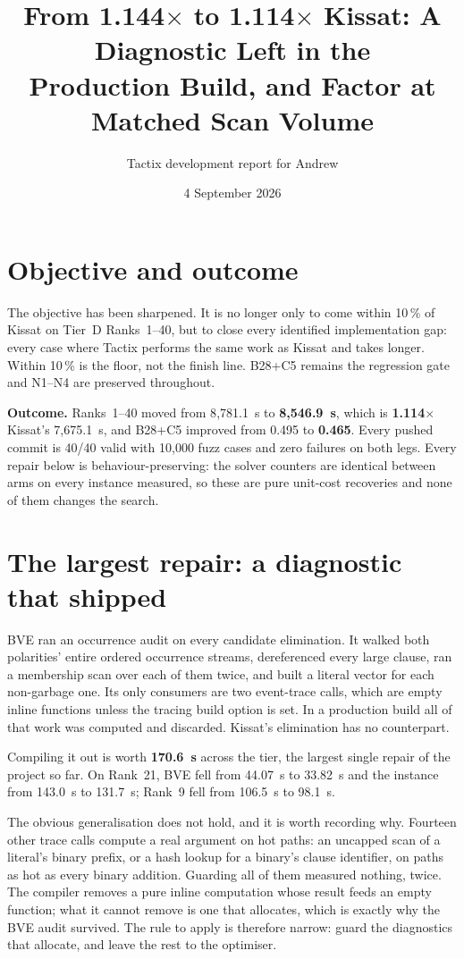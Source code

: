 \documentclass[11pt]{article}
\title{From 1.144$\times$ to 1.114$\times$ Kissat: A Diagnostic Left in the\\
Production Build, and Factor at Matched Scan Volume}
\author{Tactix development report for Andrew}
\date{4 September 2026}
\begin{document}
\maketitle

\section{Objective and outcome}

The objective has been sharpened. It is no longer only to come within 10\,\% of
Kissat on Tier~D Ranks~1--40, but to close every identified implementation gap:
every case where Tactix performs the same work as Kissat and takes longer.
Within 10\,\% is the floor, not the finish line. B28+C5 remains the regression
gate and N1--N4 are preserved throughout.

\textbf{Outcome.} Ranks~1--40 moved from 8{,}781.1~s to \textbf{8{,}546.9~s},
which is \textbf{1.114$\times$} Kissat's 7{,}675.1~s, and B28+C5 improved from
0.495 to \textbf{0.465}. Every pushed commit is 40/40 valid with 10{,}000 fuzz
cases and zero failures on both legs. Every repair below is
behaviour-preserving: the solver counters are identical between arms on every
instance measured, so these are pure unit-cost recoveries and none of them
changes the search.

\section{The largest repair: a diagnostic that shipped}

BVE ran an occurrence audit on every candidate elimination. It walked both
polarities' entire ordered occurrence streams, dereferenced every large clause,
ran a membership scan over each of them twice, and built a literal vector for
each non-garbage one. Its only consumers are two event-trace calls, which are
empty inline functions unless the tracing build option is set. In a production
build all of that work was computed and discarded. Kissat's elimination has no
counterpart.

Compiling it out is worth \textbf{170.6~s} across the tier, the largest single
repair of the project so far. On Rank~21, BVE fell from 44.07~s to 33.82~s and
the instance from 143.0~s to 131.7~s; Rank~9 fell from 106.5~s to 98.1~s.

The obvious generalisation does not hold, and it is worth recording why.
Fourteen other trace calls compute a real argument on hot paths: an uncapped
scan of a literal's binary prefix, or a hash lookup for a binary's clause
identifier, on paths as hot as every binary addition. Guarding all of them
measured nothing, twice. The compiler removes a pure inline computation whose
result feeds an empty function; what it cannot remove is one that allocates,
which is exactly why the BVE audit survived. The rule to apply is therefore
narrow: guard the diagnostics that allocate, and leave the rest to the
optimiser.
\end{document}
